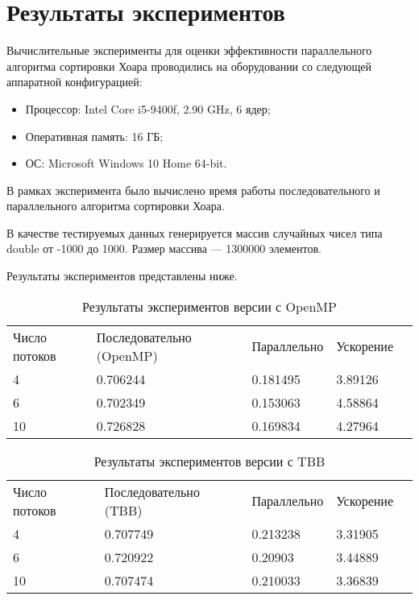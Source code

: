 \documentclass{report}
\begin{document}
\section*{Результаты экспериментов}
Вычислительные эксперименты для оценки эффективности параллельного алгоритма сортировки Хоара проводились на оборудовании со следующей аппаратной конфигурацией:

\begin{itemize}
\item Процессор: Intel Core i5-9400f, 2.90 GHz, 6 ядер;
\item Оперативная память: 16 ГБ;
\item ОС: Microsoft Windows 10 Home 64-bit.
\end{itemize}

\par В рамках эксперимента было вычислено время работы последовательного и параллельного алгоритма сортировки Хоара.
\par В качестве тестируемых данных генерируется массив случайных чисел типа double от -1000 до 1000. Размер массива --- 1300000 элементов.
\par Результаты экспериментов представлены ниже.

\begin{table}[!h]
\caption{Результаты экспериментов версии с OpenMP}
\centering
\begin{tabular}{lllll}
Число потоков & Последовательно (OpenMP) & Параллельно & Ускорение  \\
4        & 0.706244         & 0.181495     & 3.89126      \\
6        & 0.702349         & 0.153063     & 4.58864       \\
10       & 0.726828        & 0.169834     & 4.27964      
\end{tabular}
\end{table}

\begin{table}[!h]
\caption{Результаты экспериментов версии с TBB}
\centering
\begin{tabular}{lllll}
Число потоков & Последовательно (TBB) & Параллельно & Ускорение  \\
4        & 0.707749         & 0.213238     & 3.31905       \\
6        & 0.720922        & 0.20903     & 3.44889       \\
10       & 0.707474         & 0.210033     & 3.36839       
\end{tabular}
\end{table}
\end{document}
